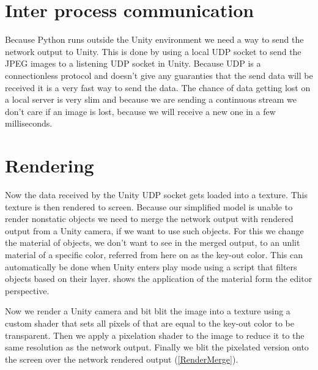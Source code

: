 \section[IPC]{Inter process communication}
Because Python runs outside the Unity environment we need a way to send the network output to Unity. This is done by using a local UDP socket to send the JPEG images to a listening UDP socket in Unity. Because UDP is a connectionless protocol and doesn't give any guaranties that the send data will be received it is a very fast way to send the data. The chance of data getting lost on a local server is very slim and because we are sending a continuous stream we don't care if an image is lost, because we will receive a new one in a few milliseconds.


\section{Rendering}\label{rendering}
Now the data received by the Unity UDP socket gets loaded into a texture. This texture is then rendered to screen. Because our simplified model is unable to render nonstatic objects we need to merge the network output with rendered output from a Unity camera, if we want to use such objects. For this we change the material of objects, we don't want to see in the merged output, to an unlit material of a specific color, referred from here on as the key-out color. This can automatically be done when Unity enters play mode using a script that filters objects based on their layer.  shows the application of the material form the editor perspective.

Now we render a Unity camera and bit blit the image into a texture using a custom shader that sets all pixels of that are equal to the key-out color to be transparent. Then we apply a pixelation shader to the image to reduce it to the same resolution as the network output. Finally we blit the pixelated version onto the screen over the network rendered output (\cref{RenderMerge}).

